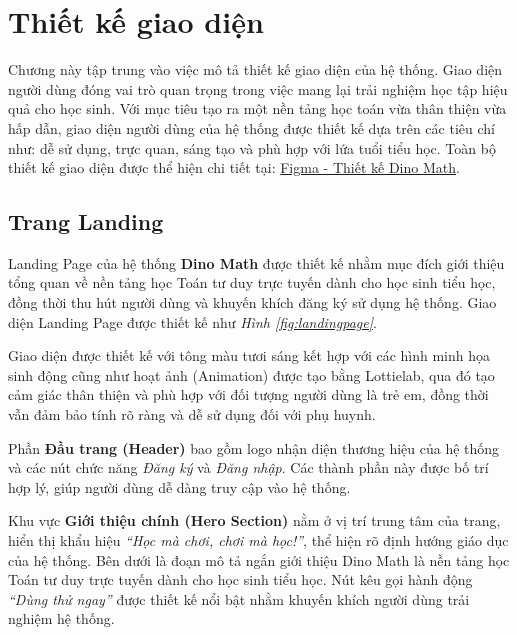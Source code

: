 \section{Thiết kế giao diện}
Chương này tập trung vào việc mô tả thiết kế giao diện của hệ thống. Giao diện người dùng đóng vai trò quan trọng trong việc mang lại trải nghiệm học tập hiệu quả cho học sinh. Với mục tiêu tạo ra một nền tảng học toán vừa thân thiện vừa hấp dẫn, giao diện người dùng của hệ thống được thiết kế dựa trên các tiêu chí như: dễ sử dụng, trực quan, sáng tạo và phù hợp với lứa tuổi tiểu học. Toàn bộ thiết kế giao diện được thể hiện chi tiết tại: \href{https://www.figma.com/design/SoUfs7Sxqv9unjfvdxj9dB/Dino---DACN?node-id=0-1&t=fxbj1E539k6XP6Ww-1}{Figma - Thiết kế Dino Math}.

\subsection{Trang Landing}
Landing Page của hệ thống \textbf{Dino Math} được thiết kế nhằm mục đích giới thiệu tổng quan về nền tảng học Toán tư duy trực tuyến dành cho học sinh tiểu học, đồng thời thu hút người dùng và khuyến khích đăng ký sử dụng hệ thống. Giao diện Landing Page được thiết kế như \textit{Hình \ref{fig:landingpage}}.

\newline
\vspace{0.5cm}
Giao diện được thiết kế với tông màu tươi sáng kết hợp với các hình minh họa sinh động cũng như hoạt ảnh (Animation) được tạo bằng Lottielab, qua đó tạo cảm giác thân thiện và phù hợp với đối tượng người dùng là trẻ em, đồng thời vẫn đảm bảo tính rõ ràng và dễ sử dụng đối với phụ huynh.

\newline
\vspace{0.5cm}
Phần \textbf{Đầu trang (Header)} bao gồm logo nhận diện thương hiệu của hệ thống và các nút chức năng \textit{Đăng ký} và \textit{Đăng nhập}. Các thành phần này được bố trí hợp lý, giúp người dùng dễ dàng truy cập vào hệ thống.

\newline
\vspace{0.5cm}
Khu vực \textbf{Giới thiệu chính (Hero Section)} nằm ở vị trí trung tâm của trang, hiển thị khẩu hiệu \textit{``Học mà chơi, chơi mà học!''}, thể hiện rõ định hướng giáo dục của hệ thống. Bên dưới là đoạn mô tả ngắn giới thiệu Dino Math là nền tảng học Toán tư duy trực tuyến dành cho học sinh tiểu học. Nút kêu gọi hành động \textit{``Dùng thử ngay''} được thiết kế nổi bật nhằm khuyến khích người dùng trải nghiệm hệ thống.

